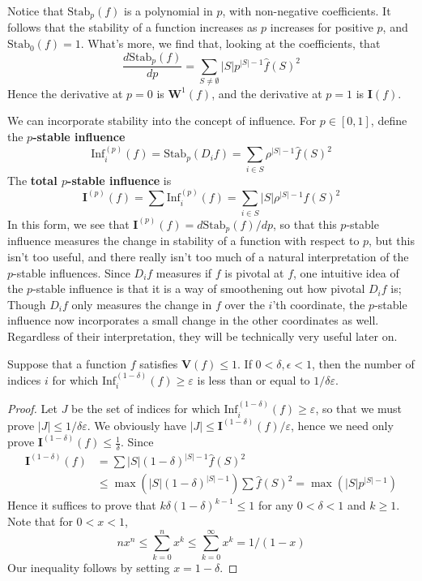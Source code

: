 Notice that $\text{Stab}_p(f)$ is a polynomial in $p$, with non-negative coefficients. It follows that the stability of a function increases as $p$ increases for positive $p$, and $\text{Stab}_0(f) = 1$. What's more, we find that, looking at the coefficients, that
%
\[ \frac{d\text{Stab}_p(f)}{dp} = \sum_{S \neq \emptyset} |S| p^{|S| - 1} \widehat{f}(S)^2 \]
%
Hence the derivative at $p = 0$ is $\mathbf{W}^1(f)$, and the derivative at $p = 1$ is $\mathbf{I}(f)$.

We can incorporate stability into the concept of influence. For $p \in [0,1]$, define the {\bf $p$-stable influence}
%
\[ \text{Inf}_i^{(p)}(f) = \text{Stab}_p(D_i f) = \sum_{i \in S} \rho^{|S| - 1} \widehat{f}(S)^2 \]
%
The {\bf total $p$-stable influence} is
%
\[ \mathbf{I}^{(p)}(f) = \sum \text{Inf}_i^{(p)}(f) = \sum_{i \in S} |S| \rho^{|S|-1} \widehat{f}(S)^2 \]
%
In this form, we see that $\mathbf{I}^{(p)}(f) = d\text{Stab}_p(f)/dp$, so that this $p$-stable influence measures the change in stability of a function with respect to $p$, but this isn't too useful, and there really isn't too much of a natural interpretation of the $p$-stable influences. Since $D_if$ measures if $f$ is pivotal at $f$, one intuitive idea of the $p$-stable influence is that it is a way of smoothening out how pivotal $D_if$ is; Though $D_if$ only measures the change in $f$ over the $i$'th coordinate, the $p$-stable influence now incorporates a small change in the other coordinates as well. Regardless of their interpretation, they will be technically very useful later on.

\begin{theorem}
    Suppose that a function $f$ satisfies $\mathbf{V}(f) \leq 1$. If $0 < \delta, \epsilon < 1$, then the number of indices $i$ for which $\text{Inf}^{(1 - \delta)}_i(f) \geq \varepsilon$ is less than or equal to $1/\delta\varepsilon$.
\end{theorem}
\begin{proof}
    Let $J$ be the set of indices for which $\text{Inf}^{(1 - \delta)}_i(f) \geq \varepsilon$, so that we must prove $|J| \leq 1/\delta\varepsilon$. We obviously have $|J| \leq \mathbf{I}^{(1 - \delta)}(f)/\varepsilon$, hence we need only prove $\mathbf{I}^{(1 - \delta)}(f) \leq \frac{1}{\delta}$. Since
    \begin{align*}
        \mathbf{I}^{(1 - \delta)}(f) &= \sum |S| (1 - \delta)^{|S|-1} \widehat{f}(S)^2\\
        &\leq \max(|S| (1 - \delta)^{|S|-1}) \sum \widehat{f}(S)^2 = \max(|S| p^{|S|-1})
    \end{align*}
    Hence it suffices to prove that $k\delta (1 - \delta)^{k - 1} \leq 1$ for any $0 < \delta < 1$ and $k \geq 1$. Note that for $0 < x < 1$,
    \[ nx^n \leq \sum_{k = 0}^n x^k \leq \sum_{k = 0}^\infty x^k = 1/(1 - x) \]
    Our inequality follows by setting $x = 1 - \delta$.
\end{proof}

